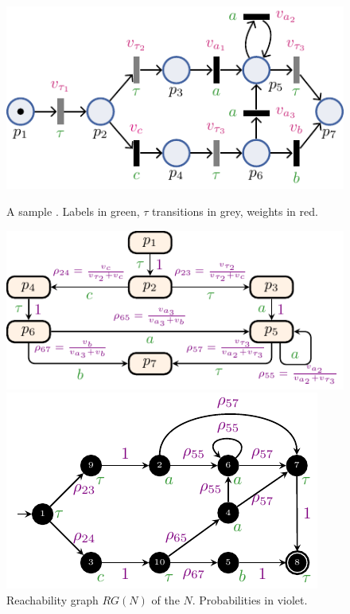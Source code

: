\begin{figure}[!t]
	\begin{minipage}{.49\textwidth}
		\includegraphics[width=.9\textwidth]{images/petri.pdf}
		\caption{A sample \uswn. Labels in green, $\tau$ transitions in grey, weights in red.}\label{fig:spn}
	\end{minipage}\hfill \begin{minipage}{.49\textwidth}
		\includegraphics[width=.9\textwidth]{images/rg.pdf}
		\caption{Reachability graph $RG(N)$ of the \uswn $N$. Probabilities in violet.}\label{fig:rg}
	\end{minipage}
	\begin{minipage}{.49\textwidth} \includegraphics[width=.9\textwidth]{images/running_example.pdf}

\end{minipage}
\end{figure}
